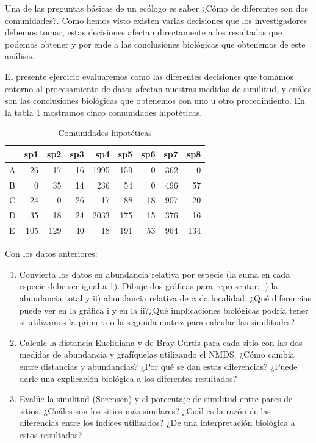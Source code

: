 \documentclass[]{book}
\begin{document}
Una de las preguntas básicas de un ecólogo es saber ¿Cómo de diferentes
son dos comunidades?. Como hemos visto existen varias decisiones que los
investigadores debemos tomar, estas decisiones afectan directamente a
los resultados que podemos obtener y por ende a las conclusiones
biológicas que obtenemos de este análisis.

El presente ejercicio evaluaremos como las diferentes decisiones que
tomamos entorno al procesamiento de datos afectan nuestras medidas de
similitud, y cuáles son las conclusiones biológicas que obtenemos con
uno u otro procedimiento. En la tabla \ref{tab:ejer1} mostramos cinco
comunidades hipotéticas.

\begin{table}[t]

\caption{\label{tab:ejer1}Comunidades hipotéticas}
\centering
\begin{tabular}{lrrrrrrrr}
\toprule
  & sp1 & sp2 & sp3 & sp4 & sp5 & sp6 & sp7 & sp8\\
\midrule
A & 26 & 17 & 16 & 1995 & 159 & 0 & 362 & 0\\
B & 0 & 35 & 14 & 236 & 54 & 0 & 496 & 57\\
C & 24 & 0 & 26 & 17 & 88 & 18 & 907 & 20\\
D & 35 & 18 & 24 & 2033 & 175 & 15 & 376 & 16\\
E & 105 & 129 & 40 & 18 & 191 & 53 & 964 & 134\\
\bottomrule
\end{tabular}
\end{table}

Con los datos anteriores:

\begin{enumerate}
\def\labelenumi{\alph{enumi}.}
\item
  Convierta los datos en abundancia relativa por especie (la suma en
  cada especie debe ser igual a 1). Dibuje dos gráficas para
  representar; i) la abundancia total y ii) abundancia relativa de cada
  localidad. ¿Qué diferencias puede ver en la gráfica i y en la ii?¿Qué
  implicaciones biológicas podría tener si utilizamos la primera o la
  segunda matriz para calcular las similitudes?
\item
  Calcule la distancia Euclidiana y de Bray Curtis para cada sitio con
  las dos medidas de abundancia y grafíquelas utilizando el NMDS. ¿Cómo
  cambia entre distancias y abundancias? ¿Por qué se dan estas
  diferencias? ¿Puede darle una explicación biológica a los diferentes
  resultados?
\item
  Evalúe la similitud (Sorensen) y el porcentaje de similitud entre
  pares de sitios. ¿Cuáles son los sitios más similares? ¿Cuál es la
  razón de las diferencias entre los índices utilizados? ¿De una
  interpretación biológica a estos resultados?
\end{enumerate}


\end{document}
